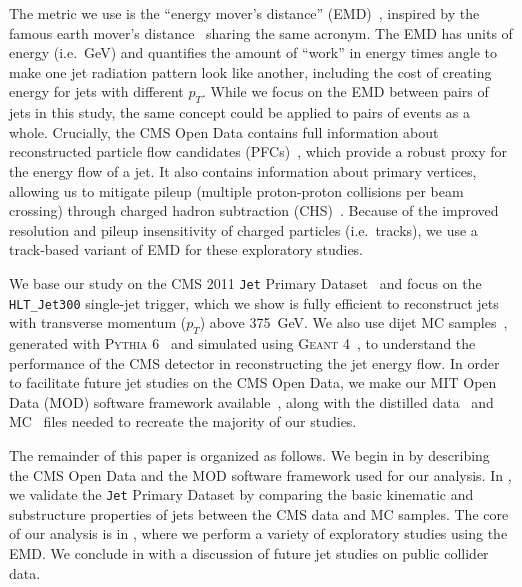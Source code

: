 \documentclass[aps,prd,twocolumn,preprintnumbers,nofootinbib,longbibliography,floatfix,superscriptaddress]{revtex4-1}
\begin{document}
The metric we use is the ``energy mover's distance'' (EMD)~\cite{Komiske:2019fks}, inspired by the famous earth mover's distance~\cite{DBLP:journals/pami/PelegWR89,Rubner:1998:MDA:938978.939133,Rubner:2000:EMD:365875.365881,DBLP:conf/eccv/PeleW08,DBLP:conf/gsi/PeleT13} sharing the same acronym.
%
The EMD has units of energy (i.e.~GeV) and quantifies the amount of ``work'' in energy times angle to make one jet radiation pattern look like another, including the cost of creating energy for jets with different $p_T$.
%
While we focus on the EMD between pairs of jets in this study, the same concept could be applied to pairs of events as a whole.
%
Crucially, the CMS Open Data contains full information about reconstructed particle flow candidates (PFCs)~\cite{CMS-PAS-PFT-09-001,CMS-PAS-PFT-10-001,Sirunyan:2017ulk}, which provide a robust proxy for the energy flow of a jet.
%
It also contains information about primary vertices, allowing us to mitigate pileup (multiple proton-proton collisions per beam crossing) through charged hadron subtraction (CHS)~\cite{CMS:2014ata}.
%
Because of the improved resolution and pileup insensitivity of charged particles (i.e.~tracks), we use a track-based variant of EMD for these exploratory studies.


We base our study on the CMS 2011 \texttt{Jet} Primary Dataset~\cite{CMS:JetPrimary2011A} and focus on the \texttt{HLT\_Jet300} single-jet trigger, which we show is fully efficient to reconstruct jets with transverse momentum ($p_T$) above \SI{375}{GeV}.
%
We also use dijet MC samples~\cite{CMS:QCDsim0-5,CMS:QCDsim5-15,CMS:QCDsim15-30,CMS:QCDsim30-50,CMS:QCDsim50-80,CMS:QCDsim80-120,CMS:QCDsim120-170,CMS:QCDsim170-300,CMS:QCDsim300-470,CMS:QCDsim470-600,CMS:QCDsim600-800,CMS:QCDsim800-1000,CMS:QCDsim1000-1400,CMS:QCDsim1400-1800,CMS:QCDsim1800}, generated with \textsc{Pythia 6}~\cite{Sjostrand:2006za} and simulated using \textsc{Geant 4}~\cite{Agostinelli:2002hh}, to understand the performance of the CMS detector in reconstructing the jet energy flow.
%
In order to facilitate future jet studies on the CMS Open Data, we make our MIT Open Data (MOD) software framework available~\cite{EnergyFlow,MODRepo}, along with the distilled data~\cite{MOD:ZenodoCMS} and MC~\cite{MOD:ZenodoMC170,MOD:ZenodoMC300,MOD:ZenodoMC470,MOD:ZenodoMC600,MOD:ZenodoMC800,MOD:ZenodoMC1000,MOD:ZenodoMC1400,MOD:ZenodoMC1800}  files needed to recreate the majority of our studies.


The remainder of this paper is organized as follows.
%
We begin in  by describing the CMS Open Data and the MOD software framework used for our analysis.
%
In , we validate the \texttt{Jet} Primary Dataset by comparing the basic kinematic and substructure properties of jets between the CMS data and MC samples.
%
The core of our analysis is in , where we perform a variety of exploratory studies using the EMD.
%
We conclude in  with a discussion of future jet studies on public collider data.
\end{document}
